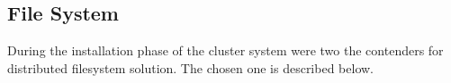 \documentclass[twoside,a4paper,12pt,english]{inac19}
\begin{document}





\subsection{File System}

During the installation phase of the cluster system\cite{cluster17} were two the contenders for
distributed filesystem solution. The chosen one is described below.
\end{document}
